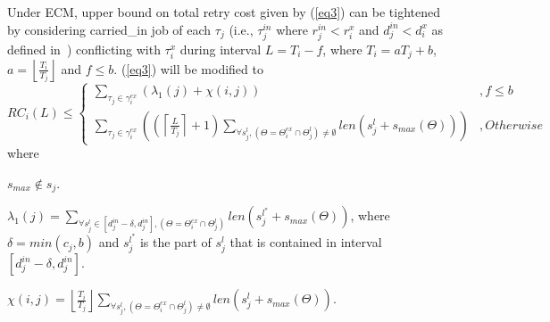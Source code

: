 \begin{clm}\label{clm:rc_i_j_gedf_Ti_carry_in}
%
Under ECM, upper bound on total retry cost given by (\ref{eq3})
can be tightened by considering carried\_in job of each $\tau_{j}$
(i.e., $\tau_{j}^{in}$ where $r_{j}^{in}<r_{i}^{x}$ and $d_{j}^{in}<d_{i}^{x}$
as defined in~\cite{key-2}) conflicting with $\tau_{i}^{x}$ during
interval $L=T_{i}-f$, where $T_{i}=aT_{j}+b$, $a=\left\lfloor \frac{T_{i}}{T_{j}}\right\rfloor $
and $f\le b$. (\ref{eq3}) will be modified to 
\begin{equation}
%
RC_{i}(L)\le\begin{cases}
\sum_{\tau_{j}\in\gamma_{i}^{ex}}\left(\lambda_{1}\left(j\right)+\chi\left(i,j\right)\right) & ,f\le b\\
\sum_{\tau_{j}\in\gamma_{i}^{ex}}\left(\left(\left\lceil\frac{L}{T_{j}}\right\rceil+1\right)\sum_{\forall s_{j}^{l},\left(\Theta=\Theta_{i}^{ex}\cap\Theta_{j}^{l}\right)\neq\emptyset}len\left(s_{j}^{l}+s_{max}(\Theta)\right)\right) & ,Otherwise
\end{cases}
\label{eq:rc_i_j_gedf_Ti_carry_in}
%
\end{equation}
%
where
\begin{compactitem}
\item $s_{max}\not\in s_{j}$.
\item $\lambda_{1}\left(j\right)=\sum_{\forall s_{j}^{l}\in\left[d_{j}^{in}-\delta,d_{j}^{in}\right],\left(\Theta=\Theta_{i}^{ex}\cap\Theta_{j}^{l}\right)}len\left(s_{j}^{l^{*}}+s_{max}\left(\Theta\right)\right)$,
where $\delta=min\left(c_{j},b\right)$ and $s_{j}^{l^{*}}$ is the
part of $s_{j}^{l}$ that is contained in interval $\left[d_{j}^{in}-\delta,d_{j}^{in}\right]$.
\item $\chi\left(i,j\right)=\left\lfloor\frac{T_{i}}{T_{j}}\right\rfloor\sum_{\forall s_{j}^{l},\left(\Theta=\Theta_{i}^{ex}\cap\Theta_{j}^{l}\right)\neq\emptyset}len\left(s_{j}^{l}+s_{max}\left(\Theta\right)\right)$.
\end{compactitem}
\end{clm}
%
